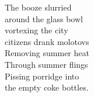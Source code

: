 The booze slurried\\
around the glass bowl\\
vortexing the city\\
citizens drank molotovs\\
Removing summer heat\\
Through summer flings\\
Pissing porridge into\\
the empty coke bottles.

